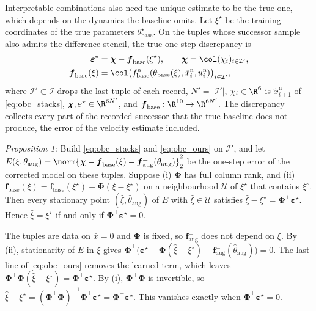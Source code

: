 Interpretable combinations also need the unique estimate to be the true one,
which depends on the dynamics the baseline omits.
Let $\xi^\star$ be the training coordinates of the true parameters
$\theta^\star_{\mathrm{base}}$.
On the tuples whose successor sample also admits the difference stencil, the
true one-step discrepancy is
\begin{equation}
\begin{aligned}
 \boldsymbol\varepsilon^\star&=\boldsymbol\chi-\boldsymbol f_{\mathrm{base}}(\xi^\star),\qquad
 \boldsymbol\chi=\col(\chi_i)_{i\in\mathcal I'},\\
 \boldsymbol f_{\mathrm{base}}(\xi)&=\col\bigl(f^{\mathrm n}_{\mathrm{base}}
   (\theta_{\mathrm{base}}(\xi),\tilde x^{\mathrm n}_i,u^{\mathrm n}_i)\bigr)_{i\in\mathcal I'},
\end{aligned}
\label{eq:obc_delta}
\end{equation}
where $\mathcal I'\subset\mathcal I$ drops the last tuple of each record,
$N'=|\mathcal I'|$, $\chi_i\in\R^6$ is $\tilde x^{\mathrm n}_{i+1}$ of
\eqref{eq:obc_stacks}, $\boldsymbol\chi,\boldsymbol\varepsilon^\star\in\R^{6N'}$,
and $\boldsymbol f_{\mathrm{base}}:\R^{10}\to\R^{6N'}$.
The discrepancy collects every part of the recorded successor that the true
baseline does not produce, the error of the velocity estimate included.

\textit{Proposition 1:} Build \eqref{eq:obc_stacks} and \eqref{eq:obc_ours} on
$\mathcal I'$, and let $E(\xi,\theta_{\mathrm{aug}})
=\norm{\boldsymbol\chi-\boldsymbol f_{\mathrm{base}}(\xi)
-\boldsymbol f^{\perp}_{\mathrm{aug}}(\theta_{\mathrm{aug}})}_2^2$ be the
one-step error of the corrected model on these tuples.
Suppose (i) $\boldsymbol\Phi$ has full column rank, and (ii)
$\boldsymbol f_{\mathrm{base}}(\xi)=\boldsymbol f_{\mathrm{base}}(\xi^\star)
+\boldsymbol\Phi(\xi-\xi^\star)$ on a neighbourhood $\mathcal U$ of $\xi^\star$
that contains $\xi^\circ$.
Then every stationary point $(\hat\xi,\hat\theta_{\mathrm{aug}})$ of $E$ with
$\hat\xi\in\mathcal U$ satisfies
$\hat\xi-\xi^\star=\boldsymbol\Phi^{+}\boldsymbol\varepsilon^\star$.
Hence $\hat\xi=\xi^\star$ if and only if
$\boldsymbol\Phi^\top\boldsymbol\varepsilon^\star=0$.

\begin{IEEEproof}
The tuples are data on $\bar x=0$ and $\boldsymbol\Phi$ is fixed, so
$\boldsymbol f^{\perp}_{\mathrm{aug}}$ does not depend on $\xi$.
By (ii), stationarity of $E$ in $\xi$ gives
$\boldsymbol\Phi^\top\bigl(\boldsymbol\varepsilon^\star
-\boldsymbol\Phi(\hat\xi-\xi^\star)
-\boldsymbol f^{\perp}_{\mathrm{aug}}(\hat\theta_{\mathrm{aug}})\bigr)=0$.
The last line of \eqref{eq:obc_ours} removes the learned term, which leaves
$\boldsymbol\Phi^\top\boldsymbol\Phi(\hat\xi-\xi^\star)
=\boldsymbol\Phi^\top\boldsymbol\varepsilon^\star$.
By (i), $\boldsymbol\Phi^\top\boldsymbol\Phi$ is invertible, so
$\hat\xi-\xi^\star=(\boldsymbol\Phi^\top\boldsymbol\Phi)^{-1}
\boldsymbol\Phi^\top\boldsymbol\varepsilon^\star
=\boldsymbol\Phi^{+}\boldsymbol\varepsilon^\star$.
This vanishes exactly when $\boldsymbol\Phi^\top\boldsymbol\varepsilon^\star=0$.
\end{IEEEproof}

